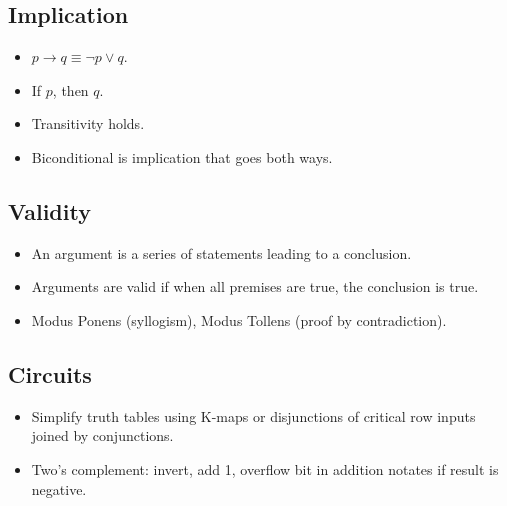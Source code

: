 \documentclass[11pt]{article}
\begin{document}
	\subsection*{Implication}
		\begin{itemize}
			\item $p\rightarrow q\equiv\lnot p\vee q$.
			\item If $p$, then $q$.
			\item Transitivity holds.
			\item Biconditional is implication that goes both ways.
		\end{itemize}
		
	\subsection*{Validity}
		\begin{itemize}
			\item An argument is a series of statements leading to a conclusion.
			\item Arguments are valid if when all premises are true, the conclusion is true.
			\item Modus Ponens (syllogism), Modus Tollens (proof by contradiction).
		\end{itemize}
		
	\subsection*{Circuits}
		\begin{itemize}
			\item Simplify truth tables using K-maps or disjunctions of critical row inputs joined by conjunctions.
			\item Two's complement: invert, add 1, overflow bit in addition notates if result is negative.
		\end{itemize}
	
%		
%		


\end{document}

